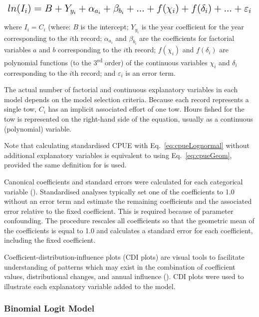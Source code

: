 \begin{align} \label{eq:cpueLognormal}
\bM{ln(I_i)=B+Y_{y_i}+\alpha_{a_i}+\beta_{b_i}+...+f(\chi_i)+f(\delta_i)+...+\varepsilon_i}
\end{align}
\begin{addmargin}[3em]{1em}
where $I_i=C_i$ (where: $B$ is the intercept; $Y_{y_i}$ is the year coefficient for the year corresponding to the $i$th record; $\alpha_{a_i}$ and $\beta_{b_i}$ are the coefficients for factorial variables $a$ and $b$ corresponding to the $i$th record; $f(\chi_i)$ and $f(\delta_i)$ are polynomial functions (to the 3\textsuperscript{rd} order) of the continuous variables $\chi_i$ and $\delta_i$ corresponding to the $i$th record; and $\varepsilon_i$ is an error term.
\end{addmargin}

The actual number of factorial and continuous explanatory variables in each model depends on the model selection criteria. Because each record represents a single tow, $C_i$ has an implicit associated effort of one tow. Hours fished for the tow is represented on the right-hand side of the equation, usually as a continuous (polynomial) variable.

Note that calculating standardised CPUE with Eq.~\ref{eq:cpueLognormal} without additional explanatory variables is equivalent to using Eq.~\ref{eq:cpueGeom}, provided the same definition for  is used.

Canonical coefficients and standard errors were calculated for each categorical variable (\citet{francis1999}). Standardised analyses typically set one of the coefficients to 1.0 without an error term and estimate the remaining coefficients and the associated error relative to the fixed coefficient. This is required because of parameter confounding. The \citet{francis1999} procedure rescales all coefficients so that the geometric mean of the coefficients is equal to 1.0 and calculates a standard error for each coefficient, including the fixed coefficient.

Coefficient-distribution-influence plots (CDI plots) are visual tools to facilitate understanding of patterns which may exist in the combination of coefficient values, distributional changes, and annual influence (\citet{bentley2011}). CDI plots were used to illustrate each explanatory variable added to the model.

\subsubsection{Binomial Logit Model}


